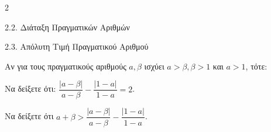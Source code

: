\begin{ylh}{2}
    \item 2.2. Διάταξη Πραγματικών Αριθμών
    \item 2.3. Απόλυτη Τιμή Πραγματικού Αριθμού
\end{ylh}
Αν για τους πραγματικούς αριθμούς $a, \beta$ ισχύει $a > \beta, \beta > 1$ και $a > 1$, τότε:

\begin{alist}
\item Να δείξετε ότι: $\dfrac{|a-\beta|}{a-\beta} - \dfrac{|1-a|}{1-a} = 2$. 
\item Να δείξετε ότι $a + \beta > \dfrac{|a-\beta|}{a-\beta} - \dfrac{|1-a|}{1-a}$. 
\end{alist}

